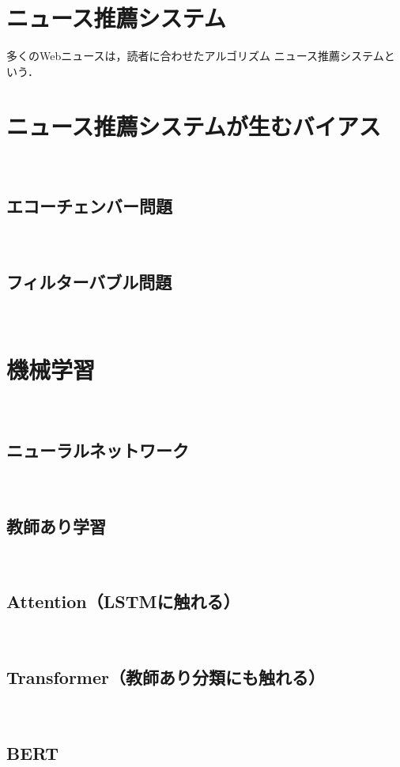 \documentclass[12pt,a4j]{jreport}
\begin{document}
\section{ニュース推薦システム}
多くのWebニュースは，読者に合わせたアルゴリズム
ニュース推薦システムという．\cite{karimi_news_2018}

\section{ニュース推薦システムが生むバイアス}
~

\subsection{エコーチェンバー問題}
~

\subsection{フィルターバブル問題}
~

\section{機械学習}
~

\subsection{ニューラルネットワーク}
~

\subsection{教師あり学習}
~

\subsection{Attention（LSTMに触れる）}
~

\subsection{Transformer（教師あり分類にも触れる）}
~

\subsection{BERT}
~
\end{document}
